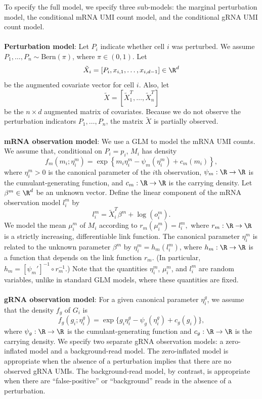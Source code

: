 \documentclass[12pt]{article}
\begin{document}
To specify the full model, we specify three sub-models: the marginal perturbation model, the conditional mRNA UMI count model, and the conditional gRNA UMI count model.
\\ \\
\noindent
\textbf{Perturbation model}: Let $P_i$ indicate whether cell $i$ was perturbed. We assume $P_1, \dots, P_n \sim \textrm{Bern}(\pi)$, where $\pi \in (0,1)$. Let
$$\tilde{X}_i = [P_i, x_{i,1}, \dots, x_{i, d-1}] \in \R^d$$ be the augmented covariate vector for cell $i$. Also, let $$ \tilde{X} = [ \tilde{X}_1^T, \dots, \tilde{X}_n^T] $$ be the $n \times d$ augmented matrix of covariates. Because we do not observe the perturbation indicators $P_1, \dots, P_n$, the matrix $\tilde{X}$ is partially observed.
\\ \\
\noindent
\textbf{mRNA observation model}: We use a GLM to model the mRNA UMI counts. We assume that, conditional on $P_i = p_i$, $M_i$ has density
$$ f_m(m_i; \eta^m_i) = \exp \left\{ m_i \eta^m_i - \psi_m(\eta^m_i) + c_m(m_i) \right\},$$ where $\eta_i^m > 0$ is the canonical parameter of the $i$th observation, $\psi_m : \R \to \R$ is the cumulant-generating function, and $ c_m : \R \to \R $ is the carrying density. Let $\beta^m \in \R^d$ be an unknown vector. Define the linear component of the mRNA observation model $l^m_i$ by $$ l_i^m = \tilde{X}_i^T \beta^m + \log(o^m_i).$$ We model the mean $\mu_i^m$ of $M_i$ according to $r_m(\mu_i^m) = l_i^m,$ where $r_m : \R \to \R$ is a strictly increasing, differentiable link function. The canonical parameter $\eta^m_i$ is related to the unknown parameter $\beta^m$ by $\eta^m_i = h_m( l_i^m)$, where $h_m : \R \to \R$ is a function that depends on the link function $r_m$. (In particular, $h_m = [ \psi_m' ]^{-1} \circ r_m^{-1}$.) Note that the quantities $\eta_i^m$, $\mu_i^m$, and $l_i^m$ are random variables, unlike in standard GLM models, where these quantities are fixed.
\\ \\
\noindent
\textbf{gRNA observation model}: For a given canonical parameter $\eta^g_i$, we assume that the density $f_g$ of $G_i$ is 
\begin{equation}\label{gRNA_model}
f_g(g_i; \eta_i^g) = \exp \{ g_i \eta_i^g - \psi_g(\eta^g_i) + c_g(g_i) \},
\end{equation} where $\psi_g : \R \to \R$ is the cumulant-generating function and $c_g : \R \to \R$ is the carrying density. We specify two separate gRNA observation models: a zero-inflated model and a background-read model. The zero-inflated model is appropriate when the absence of a perturbation implies that there are no observed gRNA UMIs. The background-read model, by contrast, is appropriate when there are ``false-positive'' or ``background'' reads in the absence of a perturbation.
\end{document}
